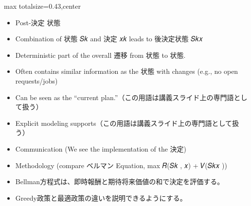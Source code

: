 \clearpage
{}
\begin{minipage}[t]{0.405\textwidth}
\begin{adjustbox}{max totalsize={\textwidth}{0.43\textheight},center}
\begin{minipage}{\textwidth}\scriptsize
{}\begin{itemize}
\item Post-決定 状態
\item Combination of 状態 𝑆𝑘 and 決定 𝑥𝑘 leads to 後決定状態 𝑆𝑘𝑥
\item Deterministic part of the overall 遷移 from 状態 to 状態.
\item Often contains similar information as the 状態 with changes (e.g., no open requests/jobs)
\item Can be seen as the “current plan.”（この用語は講義スライド上の専門語として扱う）
\item Explicit modeling supports（この用語は講義スライド上の専門語として扱う）
\item Communication (We see the implementation of the 決定)
\item Methodology (compare ベルマン Equation, max 𝑅(𝑆𝑘 , 𝑥) + 𝑉(𝑆𝑘𝑥 ))
\end{itemize}\begin{itemize}
\item Bellman方程式は、即時報酬と期待将来価値の和で決定を評価する。
\item Greedy政策と最適政策の違いを説明できるようにする。
\end{itemize}
\end{minipage}
\end{adjustbox}
\end{minipage}\hfill
